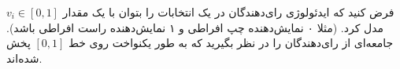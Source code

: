 فرض کنید که ایدئولوژی رای‌دهندگان در یک انتخابات را بتوان با یک مقدار
$v_i \in [0,1]$
مدل کرد. (مثلا ۰ نمایش‌دهنده چپ افراطی و ۱ نمایش‌دهنده راست افراطی باشد). جامعه‌ای از رای‌دهندگان را در نظر بگیرید که به طور یکنواخت روی خط
$[0, 1]$
پخش شده‌اند.